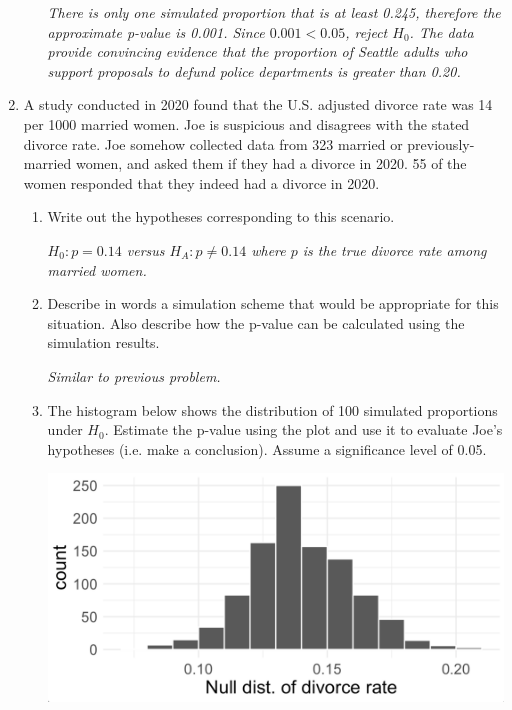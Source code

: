 \documentclass[12pt]{article}   	%
\newcommand{\soln}[2]{\textit{\textcolor{custom_red}{#2}}}{}
\begin{document}
\begin{enumerate}
\begin{enumerate}
    \soln{}{There is only one simulated proportion that is at least 0.245, therefore the approximate p-value is 0.001. Since $0.001 < 0.05$, reject $H_{0}$. The data provide convincing evidence that the proportion of Seattle adults who support proposals to
defund police departments is greater than 0.20.}
    
  \end{enumerate}
  
  \item
  A study conducted in 2020 found that the U.S. adjusted divorce rate
  was 14 per 1000 married women. Joe is suspicious and disagrees with
  the stated divorce rate. Joe somehow collected data from 323 married
  or previously-married women, and asked them if they had a divorce in
  2020. 55 of the women responded that they indeed had a divorce in
  2020.

  \begin{enumerate}
  \item
    Write out the hypotheses corresponding to this scenario.
    
    \soln{}{$H_{0}: p = 0.14$ versus $H_{A}: p \neq 0.14$ where $p$ is the true divorce rate among married women.}
    
      \item
    Describe in words a simulation scheme that would be appropriate for
    this situation. Also describe how the p-value can be calculated
    using the simulation results.
    
    \soln{}{Similar to previous problem.}
    
  \item
    The histogram below shows the distribution of 100 simulated
    proportions under \(H_{0}\). Estimate the p-value using the plot and
    use it to evaluate Joe's hypotheses (i.e. make a conclusion). Assume
    a significance level of 0.05.

    \includegraphics[scale = 0.4]{images/13-divorce.png}
    

\end{enumerate}
\end{enumerate}
\end{document}
